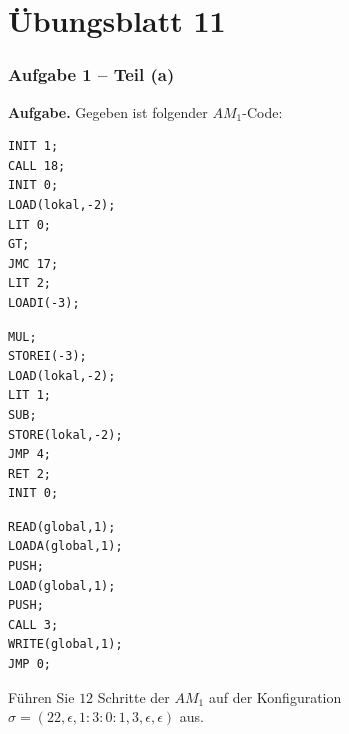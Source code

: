 \documentclass{beamer}
\begin{document}
\section{Übungsblatt 11}

\begin{frame}[fragile] \frametitle{Aufgabe 1 -- Teil (a)}
	\footnotesize
	\textbf{Aufgabe.} 
	Gegeben ist folgender $AM_1$-Code:  
	
	\begin{minipage}{\dimexpr0.33\linewidth-\fboxrule-\fboxsep}
		\begin{lstlisting}[style=am0]
INIT 1;
CALL 18;
INIT 0;
LOAD(lokal,-2);
LIT 0;
GT;
JMC 17;
LIT 2;
LOADI(-3);
		\end{lstlisting}
	\end{minipage}
	\begin{minipage}{\dimexpr0.33\linewidth-\fboxrule-\fboxsep}
		\begin{lstlisting}[style=am0, firstnumber=10]
MUL;
STOREI(-3);
LOAD(lokal,-2);
LIT 1;
SUB;
STORE(lokal,-2);
JMP 4;
RET 2;
INIT 0;
		\end{lstlisting}
	\end{minipage}
	\begin{minipage}{\dimexpr0.33\linewidth-\fboxrule-\fboxsep}
		\begin{lstlisting}[style=am0, firstnumber=19]
READ(global,1);
LOADA(global,1);
PUSH;
LOAD(global,1);
PUSH;
CALL 3;
WRITE(global,1);
JMP 0;
		\end{lstlisting}
	\end{minipage}
	
	\bigskip
	
	Führen Sie $12$ Schritte der $AM_1$ auf der Konfiguration $\sigma = (22, \epsilon, 1:3:0:1, 3, \epsilon, \epsilon)$ aus.
\end{frame}
\end{document}

